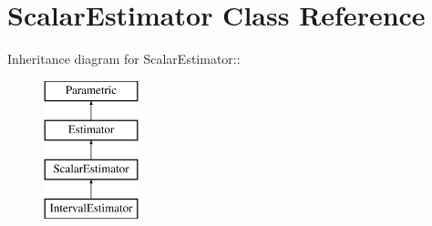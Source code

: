 \section{ScalarEstimator Class Reference}
\label{classScalarEstimator}
Inheritance diagram for ScalarEstimator::\begin{figure}[H]
\begin{center}
\leavevmode
\includegraphics[height=4cm]{classScalarEstimator}
\end{center}
\end{figure}



